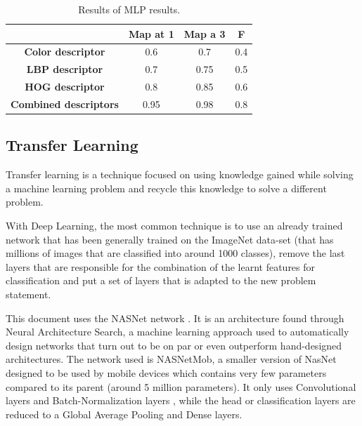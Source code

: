 \documentclass[runningheads]{llncs}
\begin{document}
\begin{table}[ht!] \label{MLPResults}
\caption{Results of MLP results.}
\begin{center}
\begin{tabular}{ | c | c | c | c | }
\hline
 & \textbf{Map at 1} & \textbf{Map a 3} & \textbf{F} \\ 
 \hline
 \textbf{Color descriptor} & 0.6 & 0.7 & 0.4 \\  
 \hline
 \textbf{LBP descriptor} & 0.7 & 0.75 & 0.5 \\ 
 \hline
 \textbf{HOG descriptor} & 0.8 & 0.85 & 0.6 \\  
 \hline
 \textbf{Combined descriptors} & 0.95 & 0.98 & 0.8 \\  
 \hline
\end{tabular}
\label{sample table}
\end{center}
\end{table}


\subsection{Transfer Learning} \label{transfer}

Transfer learning is a technique focused on using knowledge gained while solving a machine learning problem and recycle this knowledge to solve a different problem.

With Deep Learning, the most common technique is to use an already trained network that has been generally trained on the ImageNet data-set (that has millions of images that are classified into around 1000 classes), remove the last layers that are responsible for the combination of the learnt features for classification and put a set of layers that is adapted to the new problem statement.


This document uses the NASNet network . It is an architecture found through Neural Architecture Search, a machine learning approach used to automatically design networks that turn out to be on par or even outperform hand-designed architectures.
The network used is NASNetMob, a smaller version of NasNet designed to be used by mobile devices which contains very few parameters compared to its parent (around 5 million parameters). It only uses Convolutional layers  and Batch-Normalization layers , while the head or classification layers are reduced to a Global Average Pooling  and Dense layers.
\end{document}
